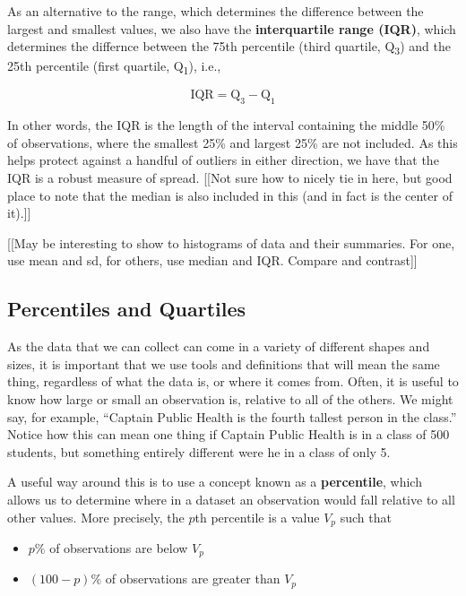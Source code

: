 \documentclass[
]{book}
\providecommand{\tightlist}{%
  \setlength{\itemsep}{0pt}\setlength{\parskip}{0pt}}
\theoremstyle{definition}
\theoremstyle{definition}
\theoremstyle{definition}
\theoremstyle{remark}
\begin{document}
As an alternative to the range, which determines the difference between the largest and smallest values, we also have the \textbf{interquartile range (IQR)}, which determines the differnce between the 75th percentile (third quartile, Q\textsubscript{3}) and the 25th percentile (first quartile, Q\textsubscript{1}), i.e.,

\[
\text{IQR} = \text{Q}_3 - \text{Q}_1
\]

In other words, the IQR is the length of the interval containing the middle 50\% of observations, where the smallest 25\% and largest 25\% are not included. As this helps protect against a handful of outliers in either direction, we have that the IQR is a robust measure of spread. {[}{[}Not sure how to nicely tie in here, but good place to note that the median is also included in this (and in fact is the center of it).{]}{]}

{[}{[}May be interesting to show to histograms of data and their summaries. For one, use mean and sd, for others, use median and IQR. Compare and contrast{]}{]}

\hypertarget{percentiles-and-quartiles}{%
\subsection{Percentiles and Quartiles}\label{percentiles-and-quartiles}}

As the data that we can collect can come in a variety of different shapes and sizes, it is important that we use tools and definitions that will mean the same thing, regardless of what the data is, or where it comes from. Often, it is useful to know how large or small an observation is, relative to all of the others. We might say, for example, ``Captain Public Health is the fourth tallest person in the class.'' Notice how this can mean one thing if Captain Public Health is in a class of 500 students, but something entirely different were he in a class of only 5.

A useful way around this is to use a concept known as a \textbf{percentile}, which allows us to determine where in a dataset an observation would fall relative to all other values. More precisely, the \(p\)th percentile is a value \(V_p\) such that

\begin{itemize}
\tightlist
\item
  \(p\%\) of observations are below \(V_p\)
\item
  \((100 - p)\%\) of observations are greater than \(V_p\)
\end{itemize}
\end{document}
